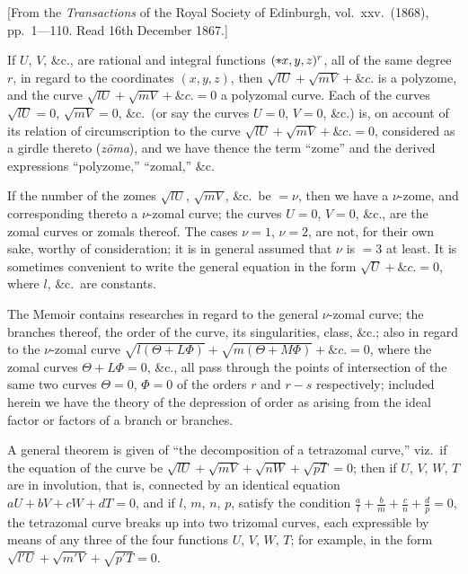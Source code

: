\documentclass[11pt,a4paper]{article}
\theoremstyle{definition}
\begin{document}
\begin{flushright}
\small[From the \textit{Transactions} of the Royal Society of Edinburgh, vol.~xxv.\ (1868), pp.~1---110. Read 16th December 1867.]
\end{flushright}

If $U$, $V$, \&c., are rational and integral functions $({*}\!\hbox{\hspace{-0.5em}}\raisebox{0.3ex}{$\scriptstyle\frown$}\!x,y,z)^r$, all of the same degree $r$, in regard to the coordinates $(x,y,z)$, then $\sqrt{lU}+\sqrt{mV}+\&c.$ is a polyzome, and the curve $\sqrt{lU}+\sqrt{mV}+\&c.=0$ a polyzomal curve. Each of the curves $\sqrt{lU}=0$, $\sqrt{mV}=0$, \&c.\ (or say the curves $U=0$, $V=0$, \&c.) is, on account of its relation of circumscription to the curve $\sqrt{lU}+\sqrt{mV}+\&c.=0$, considered as a girdle thereto (\textit{z\={o}ma}), and we have thence the term ``zome'' and the derived expressions ``polyzome,'' ``zomal,'' \&c.

If the number of the zomes $\sqrt{lU}$, $\sqrt{mV}$, \&c.\ be $=\nu$, then we have a $\nu$-zome, and corresponding thereto a $\nu$-zomal curve; the curves $U=0$, $V=0$, \&c., are the zomal curves or zomals thereof. The cases $\nu=1$, $\nu=2$, are not, for their own sake, worthy of consideration; it is in general assumed that $\nu$ is $=3$ at least. It is sometimes convenient to write the general equation in the form $\sqrt{U}+\&c.=0$, where $l$, \&c.\ are constants.

The Memoir contains researches in regard to the general $\nu$-zomal curve; the branches thereof, the order of the curve, its singularities, class, \&c.; also in regard to the $\nu$-zomal curve $\sqrt{l(\Theta+L\Phi)}+\sqrt{m(\Theta+M\Phi)}+\&c.=0$, where the zomal curves $\Theta+L\Phi=0$, \&c., all pass through the points of intersection of the same two curves $\Theta=0$, $\Phi=0$ of the orders $r$ and $r-s$ respectively; included herein we have the theory of the depression of order as arising from the ideal factor or factors of a branch or branches.

A general theorem is given of ``the decomposition of a tetrazomal curve,'' viz.\ if the equation of the curve be $\sqrt{lU}+\sqrt{mV}+\sqrt{nW}+\sqrt{pT}=0$; then if $U$, $V$, $W$, $T$ are in involution, that is, connected by an identical equation $aU+bV+cW+dT=0$, and if $l$, $m$, $n$, $p$, satisfy the condition $\frac{a}{l}+\frac{b}{m}+\frac{c}{n}+\frac{d}{p}=0$, the tetrazomal curve breaks up into two trizomal curves, each expressible by means of any three of the four functions $U$, $V$, $W$, $T$; for example, in the form $\sqrt{l'U}+\sqrt{m'V}+\sqrt{p'T}=0$.
\end{document}
